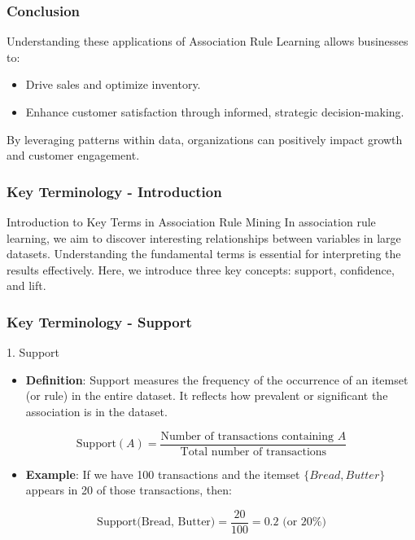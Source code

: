 \documentclass{beamer}
\begin{document}
\begin{frame}[fragile]
    \frametitle{Conclusion}
    Understanding these applications of Association Rule Learning allows businesses to:
    \begin{itemize}
        \item Drive sales and optimize inventory.
        \item Enhance customer satisfaction through informed, strategic decision-making.
    \end{itemize}

    By leveraging patterns within data, organizations can positively impact growth and customer engagement.
\end{frame}

\begin{frame}[fragile]
    \frametitle{Key Terminology - Introduction}
    \begin{block}{Introduction to Key Terms in Association Rule Mining}
        In association rule learning, we aim to discover interesting relationships between variables in large datasets. 
        Understanding the fundamental terms is essential for interpreting the results effectively. Here, we introduce three key concepts: 
        support, confidence, and lift.
    \end{block}
\end{frame}

\begin{frame}[fragile]
    \frametitle{Key Terminology - Support}
    \begin{block}{1. Support}
        \begin{itemize}
            \item \textbf{Definition}: Support measures the frequency of the occurrence of an itemset (or rule) in the entire dataset. 
            It reflects how prevalent or significant the association is in the dataset.
        \end{itemize}

        \begin{equation}
            \text{Support}(A) = \frac{\text{Number of transactions containing } A}{\text{Total number of transactions}}
        \end{equation}

        \begin{itemize}
            \item \textbf{Example}: If we have 100 transactions and the itemset $\{Bread, Butter\}$ appears in 20 of those transactions, then:
        \end{itemize}

        \begin{equation}
            \text{Support(Bread, Butter)} = \frac{20}{100} = 0.2 \text{ (or 20\%)}
        \end{equation}
    \end{block}
\end{frame}
\end{document}
